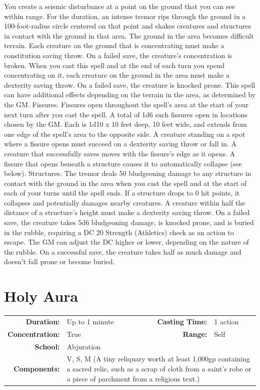 \documentclass[12pt,showtrims]{memoir}
\begin{document}
\vspace{1\baselineskip}\noindent You create a seismic disturbance at a point on the ground that you can see within range. For the duration, an intense tremor rips through the ground in a 100-foot-radius circle centered on that point and shakes creatures and structures in contact with the ground in that area. The ground in the area becomes difficult terrain. Each creature on the ground that is concentrating must make a constitution saving throw. On a failed save, the creature's concentration is broken. When you cast this spell and at the end of each turn you spend concentrating on it, each creature on the ground in the area must make a dexterity saving throw. On a failed save, the creature is knocked prone. This spell can have additional effects depending on the terrain in the area, as determined by the GM. Fissures. Fissures open throughout the spell's area at the start of your next turn after you cast the spell. A total of 1d6 such fissures open in locations chosen by the GM. Each is 1d10 x 10 feet deep, 10 feet wide, and extends from one edge of the spell's area to the opposite side. A creature standing on a spot where a fissure opens must succeed on a dexterity saving throw or fall in. A creature that successfully saves moves with the fissure's edge as it opens. A fissure that opens beneath a structure causes it to automatically collapse (see below). Structures. The tremor deals 50 bludgeoning damage to any structure in contact with the ground in the area when you cast the spell and at the start of each of your turns until the spell ends. If a structure drops to 0 hit points, it collapses and potentially damages nearby creatures. A creature within half the distance of a structure's height must make a dexterity saving throw. On a failed save, the creature takes 5d6 bludgeoning damage, is knocked prone, and is buried in the rubble, requiring a DC 20 Strength (Athletics) check as an action to escape. The GM can adjust the DC higher or lower, depending on the nature of the rubble. On a successful save, the creature takes half as much damage and doesn't fall prone or become buried.

\newpage
\section*{Holy Aura}

{
\small\centering\vspace{-6pt}
\begin{tabular}{rlrl}
\toprule

\textbf{Duration:} & Up to 1 minute &
\textbf{Casting Time:} & 1 action \\
\textbf{Concentration:} & True &
\textbf{Range:} & Self \\
\textbf{School:} & Abjuration \\
\textbf{Components:} & \multicolumn{3}{p{0.7\textwidth}}{V, S, M (A tiny reliquary worth at least 1,000gp containing a sacred relic, such as a scrap of cloth from a saint's robe or a piece of parchment from a religious text.)}\\

\bottomrule
\end{tabular}
}
\end{document}
